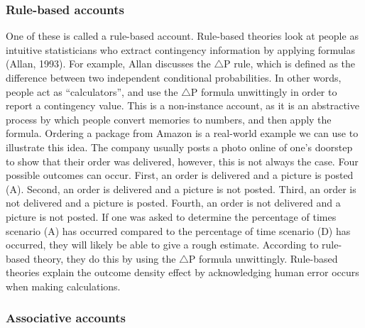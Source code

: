 \documentclass[
  english,
  man,floatsintext]{apa6}
\begin{document}
\hypertarget{rule-based-accounts}{%
\subsubsection{Rule-based accounts}\label{rule-based-accounts}}

One of these is called a rule-based account. Rule-based theories look at people as intuitive statisticians who extract contingency information by applying formulas (Allan, 1993). For example, Allan discusses the \(\triangle\)P rule, which is defined as the difference between two independent conditional probabilities. In other words, people act as \enquote{calculators}, and use the \(\triangle\)P formula unwittingly in order to report a contingency value. This is a non-instance account, as it is an abstractive process by which people convert memories to numbers, and then apply the formula. Ordering a package from Amazon is a real-world example we can use to illustrate this idea. The company usually posts a photo online of one's doorstep to show that their order was delivered, however, this is not always the case. Four possible outcomes can occur. First, an order is delivered and a picture is posted (A). Second, an order is delivered and a picture is not posted. Third, an order is not delivered and a picture is posted. Fourth, an order is not delivered and a picture is not posted. If one was asked to determine the percentage of times scenario (A) has occurred compared to the percentage of time scenario (D) has occurred, they will likely be able to give a rough estimate. According to rule-based theory, they do this by using the \(\triangle\)P formula unwittingly. Rule-based theories explain the outcome density effect by acknowledging human error occurs when making calculations.

\hypertarget{associative-accounts}{%
\subsubsection{Associative accounts}\label{associative-accounts}}
\end{document}
